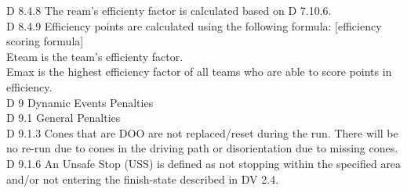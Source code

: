 \documentclass{article}
\begin{document}
D 8.4.8 The ream's efficienty factor is calculated based on D 7.10.6.\\

D 8.4.9 Efficiency points are calculated using the following formula: [efficiency scoring formula]\\
	Eteam is the team's efficienty factor.\\
	Emax is the highest efficiency factor of all teams who are able to score points in efficiency.\\

D 9 Dynamic Events Penalties\\

D 9.1 General Penalties\\

D 9.1.3 Cones that are DOO are not replaced/reset during the run. There will be no re-run due to cones in the driving path or disorientation due to missing cones.\\

D 9.1.6 An Unsafe Stop (USS) is defined as not stopping within the specified area and/or not entering the finish-state described in DV 2.4.\\
\end{document}

